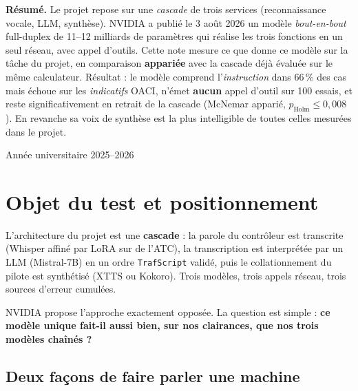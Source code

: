 \documentclass[11pt,a4paper]{article}
\begin{document}
\begin{titlepage}
\vfill
\begin{tcolorbox}[colback=lightgray, colframe=atcblue, arc=3pt, width=0.94\textwidth, center,
  left=12pt, right=12pt, top=8pt, bottom=8pt]
\small\centering
\textbf{Résumé.} Le projet repose sur une \emph{cascade} de trois services
(reconnaissance vocale, LLM, synthèse). NVIDIA a publié le 3 août 2026 un modèle
\emph{bout-en-bout} full-duplex de 11--12 milliards de paramètres qui réalise les
trois fonctions en un seul réseau, avec appel d'outils. Cette note mesure ce que
donne ce modèle sur la tâche du projet, en comparaison \textbf{appariée} avec la
cascade déjà évaluée sur le même calculateur. Résultat : le modèle comprend
l'\emph{instruction} dans 66\,\% des cas mais échoue sur les \emph{indicatifs}
OACI, n'émet \textbf{aucun} appel d'outil sur 100 essais, et reste
significativement en retrait de la cascade (McNemar apparié,
$p_{\text{Holm}} \le 0{,}008$). En revanche sa voix de synthèse est la plus
intelligible de toutes celles mesurées dans le projet.
\end{tcolorbox}
\vspace{0.6cm}
{\small Année universitaire 2025--2026}
\end{titlepage}

\tableofcontents
\thispagestyle{fancy}
\vspace{0.8cm}

\section{Objet du test et positionnement}

\begin{objbox}
L'architecture du projet est une \textbf{cascade} : la parole du contrôleur est
transcrite (Whisper affiné par LoRA sur de l'ATC), la transcription est
interprétée par un LLM (Mistral-7B) en un ordre \texttt{TrafScript} validé, puis
le collationnement du pilote est synthétisé (XTTS ou Kokoro). Trois modèles,
trois appels réseau, trois sources d'erreur cumulées.

NVIDIA propose l'approche exactement opposée. La question est simple :
\textbf{ce modèle unique fait-il aussi bien, sur nos clairances, que nos trois
modèles chaînés ?}
\end{objbox}

\subsection{Deux façons de faire parler une machine}
\end{document}
